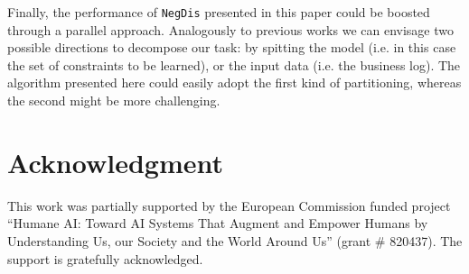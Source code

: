 \documentclass[a4wide,11pt]{article}
\theoremstyle{definition}
\theoremstyle{plain}
\newcommand{\nd}{\texttt{NegDis}\xspace}
\begin{document}
Finally, the performance of \nd presented in this paper could be boosted through a parallel approach. Analogously to previous works \cite{2018a-Maggi, 2018-Loreti, 2020b-Loreti} we can envisage two possible directions to decompose our task: by spitting the model (i.e. in this case the set of constraints to be learned), or the input data (i.e. the business log). The algorithm presented here could easily adopt the first kind of partitioning, whereas the second might be more challenging.


\section*{Acknowledgment}
This work was partially supported by the European Commission funded project ``Humane AI: Toward AI Systems That Augment and Empower Humans by Understanding Us, our Society and the World Around Us'' (grant \# 820437). The support is gratefully acknowledged.



\end{document}
